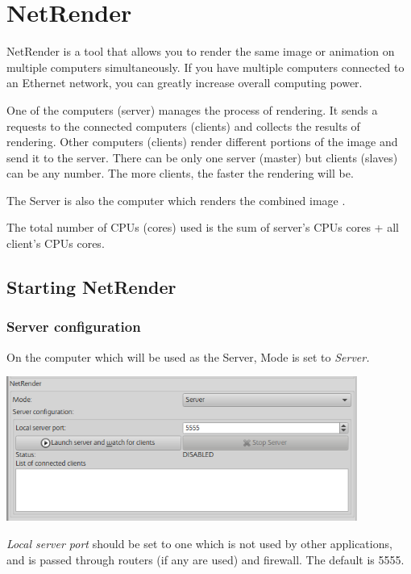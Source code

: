 \section{NetRender}\label{netrender}

NetRender is a tool that allows you to render the same image or
animation on multiple computers simultaneously. If you have multiple
computers connected to an Ethernet network, you can greatly increase
overall computing power.

One of the computers (server) manages the process of rendering. It sends
a requests to the connected computers (clients) and collects the results
of rendering. Other computers (clients) render different portions of the
image and send it to the server. There can be only one server (master)
but clients (slaves) can be any number. The more clients, the faster the
rendering will be.

The Server is also the computer which renders the combined image .

The total number of CPUs (cores) used is the sum of server's CPUs cores
+ all client's CPUs cores.

\subsection{Starting NetRender}\label{starting-netrender}

\subsubsection{Server configuration}\label{server-configuration}

On the computer which will be used as the Server, Mode is set to
\emph{Server.}

\includegraphics[width=4.53071in,height=1.86614in]{img/manual/media/image27.png}

\emph{Local server port} should be set to one which is not used by other
applications, and is passed through routers (if any are used) and
firewall. The default is 5555.

